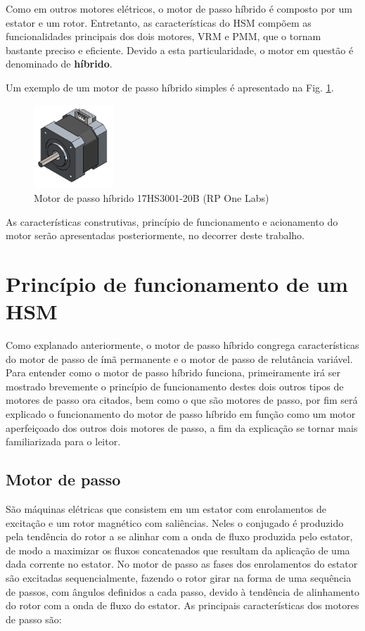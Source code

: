 \documentclass[portugues]{sobraep}
\begin{document}
	Como em outros motores elétricos, o motor de passo híbrido é composto por um estator e um rotor. Entretanto, as características do HSM compõem as funcionalidades principais dos dois motores, VRM e PMM, que o tornam bastante preciso e eficiente. Devido a esta particularidade, o motor em questão é denominado de \textbf{híbrido}.
	
	Um exemplo de um motor de passo híbrido simples é apresentado na Fig. \ref{HSMgrafico}.
	
	\begin{figure}
		\centering
		\includegraphics[width=3cm]{Images/HSMmodel.png}
		\caption{Motor de passo híbrido 17HS3001-20B (RP One Labs)}
		\label{HSMgrafico}
	\end{figure} 
	
	As características construtivas, princípio de funcionamento e acionamento do motor serão apresentadas posteriormente, no decorrer deste trabalho. 

\section{Princípio de funcionamento de um HSM}
Como explanado anteriormente, o motor de passo híbrido congrega características do motor de passo de ímã permanente e o motor de passo de relutância variável. Para entender como o motor de passo híbrido funciona, primeiramente irá ser mostrado brevemente o princípio de funcionamento destes dois outros tipos de motores de passo ora citados, bem como o que são motores de passo, por fim será explicado o funcionamento do motor de passo híbrido em função como um motor aperfeiçoado dos outros dois motores de passo, a fim da explicação se tornar mais familiarizada para o leitor.  

	\subsection{Motor de passo}
	São máquinas elétricas que consistem em um estator com enrolamentos de excitação e um rotor magnético com saliências. Neles o conjugado é produzido pela tendência do rotor a se alinhar com a onda de fluxo produzida pelo estator, de modo a maximizar os fluxos concatenados que resultam da aplicação de uma dada corrente no estator. No motor de passo as fases dos enrolamentos do estator são excitadas sequencialmente, fazendo o rotor girar na forma de uma sequência de passos, com ângulos definidos a cada passo, devido à tendência de alinhamento do rotor com a onda de fluxo do estator. \cite{Fitz} As principais características dos motores de passo são: \cite{MoonsHSM} 
	
\end{document}
